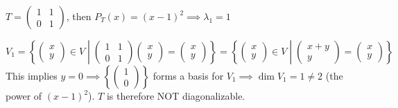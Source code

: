 \begin{example}
    \(T = \begin{pmatrix}
        1 & 1 \\
        0 & 1
    \end{pmatrix}\), then \(P_T(x) = (x-1)^2 \implies \lambda_1 = 1\)

    \[
        V_1 = \left\{\begin{pmatrix}
            x \\
            y
        \end{pmatrix} \in V \middle| \begin{pmatrix}
            1 & 1 \\
            0 & 1
        \end{pmatrix} \begin{pmatrix}
            x \\ y
        \end{pmatrix} =  \begin{pmatrix}
            x \\ y
        \end{pmatrix} \right\} = \left\{\begin{pmatrix}
            x \\
            y
        \end{pmatrix} \in V \middle| \begin{pmatrix}
            x + y \\
            y
        \end{pmatrix} =  \begin{pmatrix}
            x \\ y
        \end{pmatrix} \right\}
    \]
    This implies \(y = 0 \implies \left\{\begin{pmatrix}
        1 \\
        0
    \end{pmatrix}\right\}\) forms a basis for \(V_1 \implies \dim V_1 = 1 \neq 2\) (the power of \((x-1)^2\)). \(T\) is therefore NOT diagonalizable.
\end{example}


